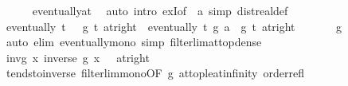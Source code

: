 \begin{isabellebody}
\ \ \ \ \isamarkupfalse%
\ eventually{\isacharunderscore}{\kern0pt}at\ \isamarkupfalse%
\ {\isacharparenleft}{\kern0pt}auto\ intro{\isacharbang}{\kern0pt}{\isacharcolon}{\kern0pt}\ exI{\isacharbrackleft}{\kern0pt}of\ {\isacharunderscore}{\kern0pt}\ a{\isacharbrackright}{\kern0pt}\ simp{\isacharcolon}{\kern0pt}\ dist{\isacharunderscore}{\kern0pt}real{\isacharunderscore}{\kern0pt}def{\isacharparenright}{\kern0pt}\isanewline
\isanewline
\ \ \isamarkupfalse%
\isanewline
\ \ \isamarkupfalse%
\ {\isachardoublequoteopen}eventually\ {\isacharparenleft}{\kern0pt}{\isasymlambda}t{\isachardot}{\kern0pt}\ {}\ {\isacharless}{\kern0pt}\ g\ t{\isacharparenright}{\kern0pt}\ {\isacharparenleft}{\kern0pt}at{\isacharunderscore}{\kern0pt}right\ {}{\isacharparenright}{\kern0pt}{\isachardoublequoteclose}\ {\isachardoublequoteopen}eventually\ {\isacharparenleft}{\kern0pt}{\isasymlambda}t{\isachardot}{\kern0pt}\ g\ a\ {\isacharless}{\kern0pt}\ g\ t{\isacharparenright}{\kern0pt}\ {\isacharparenleft}{\kern0pt}at{\isacharunderscore}{\kern0pt}right\ {}{\isacharparenright}{\kern0pt}{\isachardoublequoteclose}\isanewline
\ \ \ \ \isamarkupfalse%
\ g{\isacharunderscore}{\kern0pt}{}\ \isamarkupfalse%
\ {\isacharparenleft}{\kern0pt}auto\ elim{\isacharcolon}{\kern0pt}\ eventually{\isacharunderscore}{\kern0pt}mono\ simp{\isacharcolon}{\kern0pt}\ filterlim{\isacharunderscore}{\kern0pt}at{\isacharunderscore}{\kern0pt}top{\isacharunderscore}{\kern0pt}dense{\isacharparenright}{\kern0pt}\isanewline
\isanewline
\ \ \isamarkupfalse%
\isanewline
\ \ \isamarkupfalse%
\ inv{\isacharunderscore}{\kern0pt}g{\isacharcolon}{\kern0pt}\ {\isachardoublequoteopen}{\isacharparenleft}{\kern0pt}{\isacharparenleft}{\kern0pt}{\isasymlambda}x{\isachardot}{\kern0pt}\ inverse\ {\isacharparenleft}{\kern0pt}g\ x{\isacharparenright}{\kern0pt}{\isacharparenright}{\kern0pt}\ {\isasymlonglongrightarrow}\ {}{\isacharparenright}{\kern0pt}\ {\isacharparenleft}{\kern0pt}at{\isacharunderscore}{\kern0pt}right\ {}{\isacharparenright}{\kern0pt}{\isachardoublequoteclose}\isanewline
\ \ \ \ \isamarkupfalse%
\ tendsto{\isacharunderscore}{\kern0pt}inverse{\isacharunderscore}{\kern0pt}{}\ filterlim{\isacharunderscore}{\kern0pt}mono{\isacharbrackleft}{\kern0pt}OF\ g{\isacharunderscore}{\kern0pt}{}\ at{\isacharunderscore}{\kern0pt}top{\isacharunderscore}{\kern0pt}le{\isacharunderscore}{\kern0pt}at{\isacharunderscore}{\kern0pt}infinity\ order{\isacharunderscore}{\kern0pt}refl{\isacharbrackright}{\kern0pt}\isanewline

\end{isabellebody}
